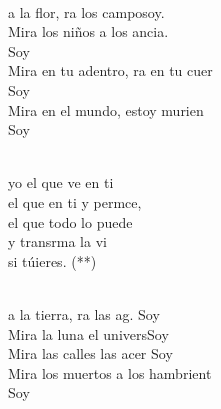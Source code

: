 \documentclass[12pt]{article}
\begin{document}
\begin{multicols*}{2}
\begin{cancion}[Soy yo][Almudena]%
	    \\
	a la flor, ra los camposoy.\\
	Mira los niños a los ancia. \\
	Soy \\
	Mira en tu adentro, ra en tu cuer\\
	Soy \\
	Mira en el mundo,  estoy murien \\
	Soy \\\jump\\
	\begin{chorus}%
	 yo el que ve en ti\\
	el que  en ti y permce,\\
el que todo lo puede \\
	y transrma la vi\\
	si túieres. (**)\\
	\end{chorus}%
	\jump\\
	a la tierra, ra las ag. Soy\\
	Mira la luna el universSoy \\
	Mira las calles las acer Soy \\
	Mira los muertos a los hambrient\\
	Soy \\
\end{cancion}%


\end{multicols*}
\end{document}
